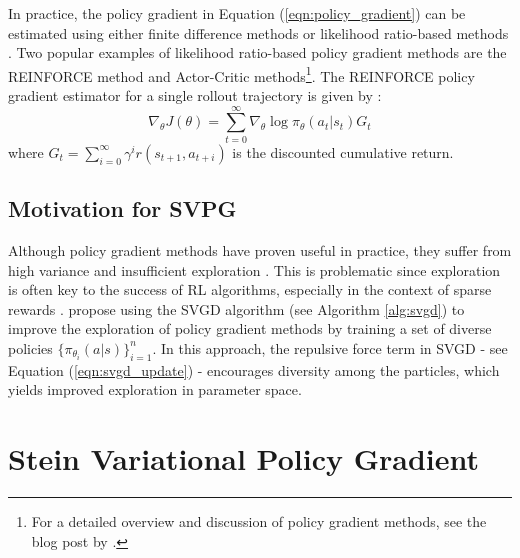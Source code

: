 In practice, the policy gradient in Equation (\ref{eqn:policy_gradient}) can be estimated using either finite difference methods or likelihood ratio-based methods \citep[e.g.,][]{peters_policy_gradients, liu_svpg}. Two popular examples of likelihood ratio-based policy gradient methods are the REINFORCE method \citep{williams_reinforce} and Actor-Critic methods\footnote{For a detailed overview and discussion of policy gradient methods, see the blog post by \citet{weng_pg_blog}.}. The REINFORCE policy gradient estimator for a single rollout trajectory is given by \citet{liu_svpg}:
\begin{equation*}
\nabla_{\theta} J(\theta) = \sum_{t=0}^{\infty} \nabla_{\theta} \log \pi_{\theta}(a_t|s_t)G_t
\end{equation*}
where $G_t = \sum_{i=0}^{\infty}\gamma^i r(s_{t+1}, a_{t+i})$ is the discounted cumulative return.


\subsection*{Motivation for SVPG}

Although policy gradient methods have proven useful in practice, they suffer from high variance and insufficient exploration \citep{liu_svpg, cohen_exploration}. This is problematic since exploration is often key to the success of RL algorithms, especially in the context of sparse rewards \citep[see, ][]{weng_exploration}. \citet{liu_svpg} propose using the SVGD algorithm (see Algorithm \ref{alg:svgd}) to improve the exploration of policy gradient methods by training a set of diverse policies $\{\pi_{\theta_i}(a|s)\}_{i=1}^n$. In this approach, the repulsive force term in SVGD - see Equation (\ref{eqn:svgd_update}) - encourages diversity among the particles, which yields improved exploration in parameter space.

\section{Stein Variational Policy Gradient}

